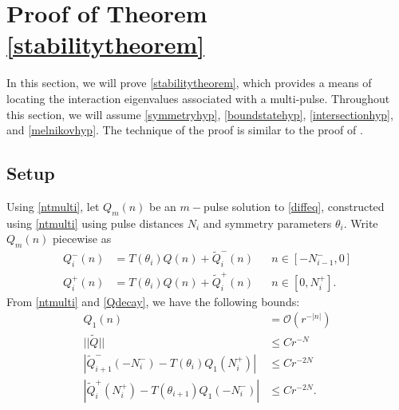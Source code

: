 \documentclass[12pt]{elsarticle}
\begin{document}
\section{Proof of Theorem \ref{stabilitytheorem}}

In this section, we will prove \cref{stabilitytheorem}, which provides a means of locating the interaction eigenvalues associated with a multi-pulse. Throughout this section, we will assume \cref{symmetryhyp}, \cref{boundstatehyp}, \cref{intersectionhyp}, and \cref{melnikovhyp}. The technique of the proof is similar to the proof of \cite[Theorem 2]{Sandstede1998}.

\subsection{Setup}

Using \cref{ntmulti}, let $Q_m(n)$ be an $m-$pulse solution to \cref{diffeq}, constructed using \cref{ntmulti} using pulse distances $N_i$ and symmetry parameters $\theta_i$. Write $Q_m(n)$ piecewise as
\begin{equation}\label{Qmpiecewise}
\begin{aligned}
Q_i^-(n) &= T(\theta_i) Q(n) + \tilde{Q}_i^-(n) && n \in [-N_{i-1}^-, 0] \\
Q_i^+(n) &= T(\theta_i) Q(n) + \tilde{Q}_i^+(n) && n \in [0, N_i^+].
\end{aligned}
\end{equation}
From \cref{ntmulti} and \cref{Qdecay}, we have the following bounds:
\begin{equation}\label{stabbounds1}
\begin{aligned}
Q_1(n) &= \mathcal{O}(r^{-|n|}) \\
||\tilde{Q}|| &\leq C r^{-N} \\
|\tilde{Q}_{i+1}^-(-N_i^-) - T(\theta_i) Q_1(N_i^+)| &\leq C r^{-2N} \\
|\tilde{Q}_i^+(N_i^+) - T(\theta_{i+1}) Q_1(-N_i^-)| &\leq C r^{-2N}.
\end{aligned}
\end{equation}
\end{document}
